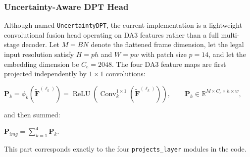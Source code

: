 \subsubsection*{Uncertainty-Aware DPT Head}
Although named \texttt{UncertaintyDPT}, the current implementation is a lightweight convolutional fusion head operating on DA3 features rather than a full multi-stage decoder. Let $M=BN$ denote the flattened frame dimension, let the legal input resolution satisfy $H=ph$ and $W=pw$ with patch size $p=14$, and let the embedding dimension be $C_e=2048$. The four DA3 feature maps are first projected independently by $1\times 1$ convolutions:
\begin{center}
    $\displaystyle
    \mathbf{P}_k = \phi_k\!\left(\tilde{\mathbf{F}}^{(\ell_k)}\right)
    = \operatorname{ReLU}\!\left(\operatorname{Conv}^{1\times 1}_k\!\left(\tilde{\mathbf{F}}^{(\ell_k)}\right)\right),
    \qquad
    \mathbf{P}_k \in \mathbb{R}^{M\times C_e\times h\times w},
    $
\end{center}
and then summed:
\begin{center}
    $\displaystyle
    \mathbf{P}_{img} = \sum_{k=1}^{4}\mathbf{P}_k.
    $
\end{center}
This part corresponds exactly to the four \texttt{projects\_layer} modules in the code.

